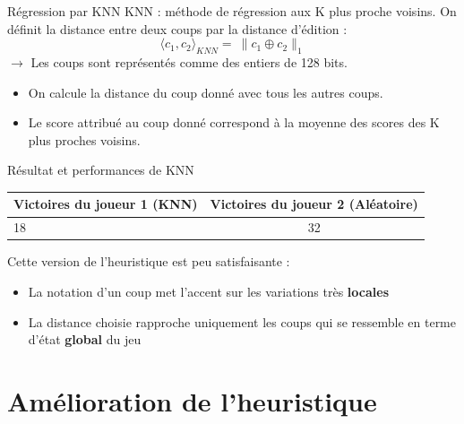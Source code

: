 \documentclass{beamer}
\begin{document}
\begin{frame}{Régression par KNN}
    KNN : méthode de régression aux \alert{K plus proche voisins}.
    On définit la distance entre deux coups par la \alert{distance d'édition} :
    $$ \langle c_1, c_2 \rangle_{KNN} = \ \rVert c_1 \oplus c_2 \lVert_1 $$
    $\rightarrow$ Les coups sont représentés comme des entiers de 128 bits.
    \begin{itemize}
        \item On calcule la distance du coup donné avec tous les autres coups.
        \item Le score attribué au coup donné correspond à \alert{la moyenne des scores} des K plus proches voisins.
    \end{itemize}
\end{frame}

\begin{frame}{Résultat et performances de KNN}
    \begin{center}
        \begin{tabular}{ | l | c | }
            \hline
            Victoires du joueur 1 (KNN) & Victoires du joueur 2 (Aléatoire) \\ \hline
            18                          & 32                                \\ \hline
        \end{tabular}
    \end{center}
    Cette version de l'heuristique est peu satisfaisante :
    \begin{itemize}
        \item La notation d'un coup met l'accent sur les variations très \textbf{locales}
        \item La distance choisie rapproche uniquement les coups qui se ressemble en terme d'état \textbf{global} du jeu
    \end{itemize}
\end{frame}

{\section{Amélioration de l'heuristique}}
\end{document}
